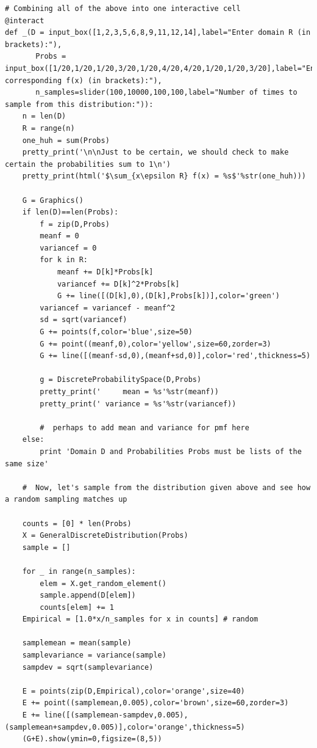 \documentclass[10pt,]{book}
\theoremstyle{plain}
\theoremstyle{definition}
\theoremstyle{definition}
\numberwithin{equation}{section}
\begin{document}
\begin{lstlisting}[style=sageinput]
# Combining all of the above into one interactive cell
@interact
def _(D = input_box([1,2,3,5,6,8,9,11,12,14],label="Enter domain R (in brackets):"), 
       Probs = input_box([1/20,1/20,1/20,3/20,1/20,4/20,4/20,1/20,1/20,3/20],label="Enter corresponding f(x) (in brackets):"),
       n_samples=slider(100,10000,100,100,label="Number of times to sample from this distribution:")):
    n = len(D)
    R = range(n)
    one_huh = sum(Probs)
    pretty_print('\n\nJust to be certain, we should check to make certain the probabilities sum to 1\n')
    pretty_print(html('$\sum_{x\epsilon R} f(x) = %s$'%str(one_huh)))
    
    G = Graphics()
    if len(D)==len(Probs):
        f = zip(D,Probs)
        meanf = 0
        variancef = 0
        for k in R:
            meanf += D[k]*Probs[k]
            variancef += D[k]^2*Probs[k]
            G += line([(D[k],0),(D[k],Probs[k])],color='green')
        variancef = variancef - meanf^2
        sd = sqrt(variancef)
        G += points(f,color='blue',size=50)
        G += point((meanf,0),color='yellow',size=60,zorder=3)
        G += line([(meanf-sd,0),(meanf+sd,0)],color='red',thickness=5)
    
        g = DiscreteProbabilitySpace(D,Probs)
        pretty_print('     mean = %s'%str(meanf))
        pretty_print(' variance = %s'%str(variancef))
    
        #  perhaps to add mean and variance for pmf here
    else:
        print 'Domain D and Probabilities Probs must be lists of the same size'
    
    #  Now, let's sample from the distribution given above and see how a random sampling matches up

    counts = [0] * len(Probs)
    X = GeneralDiscreteDistribution(Probs)
    sample = []

    for _ in range(n_samples):
        elem = X.get_random_element()
        sample.append(D[elem])
        counts[elem] += 1
    Empirical = [1.0*x/n_samples for x in counts] # random
    
    samplemean = mean(sample)
    samplevariance = variance(sample)
    sampdev = sqrt(samplevariance)
    
    E = points(zip(D,Empirical),color='orange',size=40)
    E += point((samplemean,0.005),color='brown',size=60,zorder=3)
    E += line([(samplemean-sampdev,0.005),(samplemean+sampdev,0.005)],color='orange',thickness=5)    
    (G+E).show(ymin=0,figsize=(8,5))
\end{lstlisting}
\end{document}

